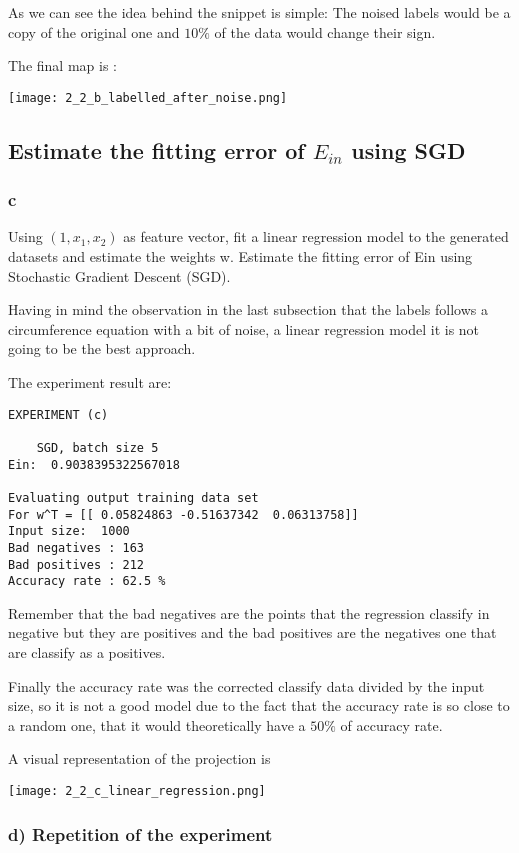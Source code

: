   As we can see the idea behind the snippet is simple: The noised labels would be a copy of the original one and $10\%$ of the data would change their sign.

  The final map is :


  \texttt{[image: 2\_2\_b\_labelled\_after\_noise.png]}
  

  \subsection{ Estimate the fitting error of $E_{in}$ using SGD}

  \subsubsection{c}
  Using $(1, x_1, x_2)$ as feature vector, fit a linear regression model to the generated datasets and estimate the weights w. Estimate the fitting error of Ein using Stochastic Gradient Descent (SGD).

  Having in mind the observation in the last subsection that the labels follows a circumference equation with a bit of noise, a linear regression model it is not going to be the best approach.

  The experiment result are:
\begin{verbatim}
EXPERIMENT (c) 

	SGD, batch size 5
Ein:  0.9038395322567018

Evaluating output training data set
For w^T = [[ 0.05824863 -0.51637342  0.06313758]]
Input size:  1000
Bad negatives : 163
Bad positives : 212
Accuracy rate : 62.5 %
\end{verbatim}


Remember that the bad negatives are the points that the regression classify in negative but they are positives and the bad positives are the negatives one that are classify as a positives.

Finally the accuracy rate was the corrected classify data divided by the input size, so it is not a good model due to the fact that the accuracy rate is so close to a random one, that it would theoretically have a $50\%$ of accuracy rate.

A visual representation of the projection is


\texttt{[image: 2\_2\_c\_linear\_regression.png]}

\subsubsection{d) Repetition of the experiment}

